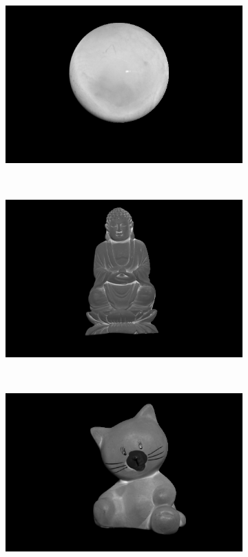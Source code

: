 \documentclass{paper}
\begin{document}
\begin{figure}[h!]
    \centering
    \begin{subfigure}{0.3\textwidth}
        \includegraphics[width=\textwidth]{results/gray/gray_a_lu}
    \end{subfigure}
    ~
    \begin{subfigure}{0.3\textwidth}
        \includegraphics[width=\textwidth]{results/buddha/buddha_a_lu}
    \end{subfigure}
    ~
    \begin{subfigure}{0.3\textwidth}
        \includegraphics[width=\textwidth]{results/cat/cat_a_lu}
    \end{subfigure}
    

\end{figure}
\end{document}
